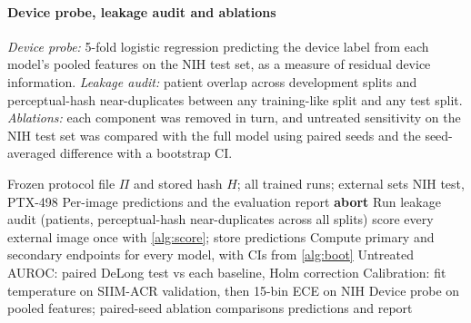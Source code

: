 \documentclass[final,3p]{elsarticle}
\begin{document}
\paragraph{Device probe, leakage audit and ablations}
\emph{Device probe:} 5-fold logistic regression predicting the device label from each model's pooled features on the NIH test set, as a measure of residual device information. \emph{Leakage audit:} patient overlap across development splits and perceptual-hash near-duplicates between any training-like split and any test split. \emph{Ablations:} each component was removed in turn, and untreated sensitivity on the NIH test set was compared with the full model using paired seeds and the seed-averaged difference with a bootstrap CI.

\begin{algorithm}[!tbp]
\caption{Single external evaluation (stage \emph{planb\_gate2})}
\label{alg:eval}
\begin{algorithmic}[1]
\Require Frozen protocol file $\Pi$ and stored hash $H$; all trained runs; external sets NIH test, PTX-498
\Ensure Per-image predictions and the evaluation report
 \State \textbf{abort}  \label{line:hash}
\EndIf
\State Run leakage audit (patients, perceptual-hash near-duplicates across all splits)
 \State score every external image once with \cref{alg:score}; store predictions
\EndFor
\State Compute primary and secondary endpoints for every model, with CIs from \cref{alg:boot}
\State Untreated AUROC: paired DeLong test vs each baseline, Holm correction
\State Calibration: fit temperature on SIIM-ACR validation, then 15-bin ECE on NIH
\State Device probe on pooled features; paired-seed ablation comparisons
\State \Return predictions and report
\end{algorithmic}
\end{algorithm}
\end{document}
